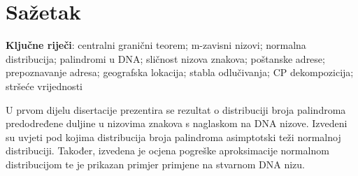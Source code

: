 \chapter*{Sažetak}

\begin{center}
	\textbf{Ključne riječi}: 
	centralni granični teorem;
	m-zavisni nizovi;
	normalna distribucija;
	palindromi u DNA;
	sličnost nizova znakova;
	poštanske adrese;
	prepoznavanje adresa;
	geografska lokacija;
	stabla odlučivanja;
	CP dekompozicija;
	stršeće vrijednosti
\end{center}

\vspace{3ex}

U prvom dijelu disertacije prezentira se rezultat o distribuciji broja
palindroma predodređene duljine u nizovima znakova s naglaskom
na DNA nizove.
Izvedeni su uvjeti pod kojima distribucija broja palindroma
asimptotski teži normalnoj distribuciji.
Također, izvedena je ocjena pogreške
aproksimacije normalnom distribucijom
te je prikazan primjer primjene na stvarnom DNA nizu.

